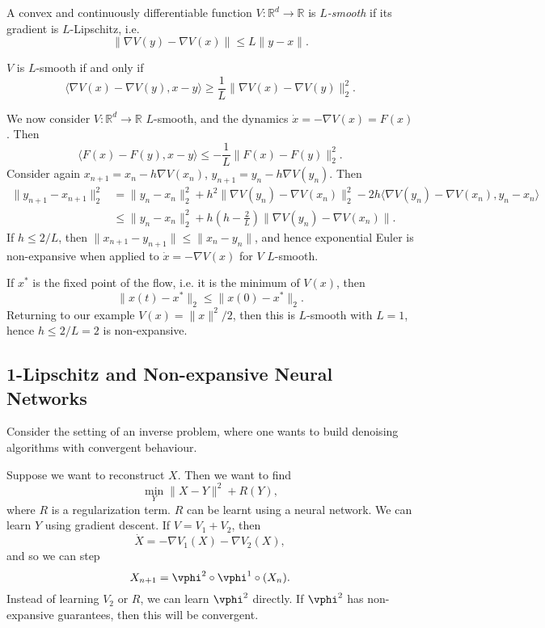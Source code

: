 \documentclass[12pt]{article}
\begin{document}
\begin{definition}
	A convex and continuously differentiable function $V : \mathbb{R}^{d} \to \mathbb{R}$ is \emph{$L$-smooth} if its gradient is $L$-Lipschitz, i.e.
	\[
	\|\nabla V(y) - \nabla V(x)\| \leq L \|y - x\|.
	\]
\end{definition}

\begin{theorem}
	$V$ is $L$-smooth if and only if
	\[
	\langle \nabla V(x) - \nabla V(y), x - y \rangle \geq \frac 1 L \|\nabla V(x) - \nabla V(y)\|_2^2.
	\]
\end{theorem}

We now consider $V : \mathbb{R}^{d} \to \mathbb{R}$ $L$-smooth, and the dynamics $\dot x = - \nabla V(x) = F(x)$. Then
\[
\langle F(x) - F(y), x - y \rangle \leq -\frac{1}{L} \|F(x) - F(y)\|_2^2.
\]
Consider again $x_{n+1} = x_n - h \nabla V(x_n)$, $y_{n+1} = y_n - h \nabla V(y_n)$. Then
\begin{align*}
	\|y_{n+1} - x_{n+1}\|_2^2 &= \|y_n - x_n\|_2^2 + h^2 \|\nabla V(y_n) - \nabla V(x_n)\|_2^2 - 2 h \langle \nabla V(y_n) - \nabla V(x_n), y_n - x_n \rangle \\
				  & \leq \|y_n - x_n\|_2^2 + h \left( h - \frac{2}{L} \right) \|\nabla V(y_n) - \nabla V(x_n)\|.
\end{align*}
If $h \leq 2/L$, then $\|x_{n+1} - y_{n+1}\| \leq \|x_n - y_n\|$, and hence exponential Euler is non-expansive when applied to $\dot x = - \nabla V(x)$ for $V$ $L$-smooth.

If $x^{\ast}$ is the fixed point of the flow, i.e. it is the minimum of $V(x)$, then
\[
\|x(t) - x^{\ast}\|_2 \leq \|x(0) - x^{\ast}\|_2.
\]
Returning to our example $V(x) = \|x\|^2/2$, then this is $L$-smooth with $L = 1$, hence $h \leq 2/ L = 2$ is non-expansive.

\subsection{1-Lipschitz and Non-expansive Neural Networks}%
\label{sub:lnnn}

Consider the setting of an inverse problem, where one wants to build denoising algorithms with convergent behaviour.

Suppose we want to reconstruct $X$. Then we want to find
\[
\min_Y \|X - Y\|^2 + R(Y),
\]
where $R$ is a regularization term. $R$ can be learnt using a neural network. We can learn $Y$ using gradient descent. If $V = V_1 + V_2$, then
\[
\dot X = - \nabla V_1(X) - \nabla V_2(X),
\]
and so we can step
\[
X_{n+1} = \vphi^{2} \circ \vphi^{1} \circ (X_n).
\]
Instead of learning $V_2$ or $R$, we can learn $\vphi^{2}$ directly. If $\vphi^{2}$ has non-expansive guarantees, then this will be convergent.
\end{document}
